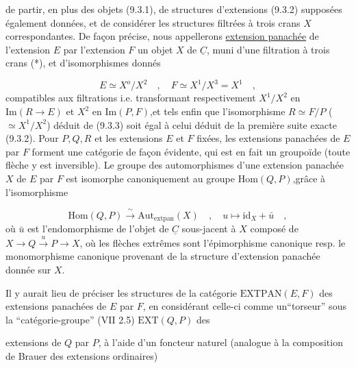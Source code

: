 
de partir, en plus des objets (9.3.1), de structures d'extensions (9.3.2) supposées également données, et de considérer les structures filtrées à trois crans $X$ correspondantes. De façon précise, nous appellerons \underline{extension panachée} de l'extension $E$ par l'extension $F$ un objet $X$ de $\underline{C}$, muni d'une filtration à trois crans (*), et d'isomorphismes donnés

\begin{equation}\tag{9.3.3}
E \simeq X^o/X^2 \quad , \quad F \simeq X^1/X^3 = X^1 \quad ,
\end{equation}
compatibles aux filtrations i.e. transformant respectivement $X^1/X^2$ en $\mathrm{Im}(R \longrightarrow E)$ et $X^2$ en $\mathrm{Im}(P,F)$,et tels enfin que l'isomorphisme $R \simeq F/P$ ($\simeq X^1/X^2$) déduit de (9.3.3) soit égal à celui déduit de la première suite exacte (9.3.2). Pour $P,Q,R$ et les extensions $E$ et $F$ fixées, les extensions panachées de $E$ par $F$ forment une catégorie de façon évidente, qui est en fait un groupoïde (toute flèche y est inversible). Le groupe des automorphismes d'une extension panachée $X$ de $E$ par $F$ est isomorphe canoniquement au groupe $\mathrm{Hom}(Q,P)$,grâce à l'isomorphisme

\begin{equation}\tag{9.3.4}
\mathrm{Hom}(Q,P) \xrightarrow{\ \sim\ } \mathrm{Aut}_{\mathrm{extpan}}(X) \quad , \quad u \longmapsto \mathrm{id}_X + \bar{u} \quad ,
\end{equation}
où $\bar{u}$ est l'endomorphisme de l'objet de $\underline{C}$ sous-jacent à $X$ composé de $X \longrightarrow Q \xrightarrow{\ u\ } P \longrightarrow X$, où les flèches extrêmes sont l'épimorphisme canonique resp. le monomorphisme canonique provenant de la structure d'extension panachée donnée sur $X$.

Il y aurait lieu de préciser les structures de la catégorie $\mathrm{EXTPAN}(E,F)$ des extensions panachées de $E$ par $F$, en considérant celle-ci comme un``torseur'' sous la ``catégorie-groupe'' (VII 2.5) $\mathrm{EXT}(Q,P)$ des



extensions de $Q$ par $P$, à l'aide d'un foncteur naturel (analogue à la composition de Brauer des extensions ordinaires)

